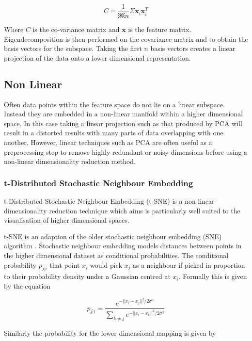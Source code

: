 \begin{equation}
	C = \frac{1}{￼n}\Sigma \mathbf{x}_i \mathbf{x}_i^T
\end{equation}

Where $C$ is the co-variance matrix and $\mathbf{x}$ is the feature matrix. Eigendecomposition is then performed on the covariance matrix and to obtain the basis vectors for the subspace. Taking the first $n$ basis vectors creates a linear projection of the data onto a lower dimensional representation.

\subsection{Non Linear}
Often data points within the feature space do not lie on a linear subspace. Instead they are embedded in a non-linear manifold within a higher dimensional space. In this case taking a linear projection such as that produced by PCA will result in a distorted results with many parts of data overlapping with one another. However, linear techniques such as PCA are often useful as a preprocessing step to remove highly redundant or noisy dimensions before using a non-linear dimensionality reduction method.

\subsubsection{t-Distributed Stochastic Neighbour Embedding}
t-Distributed Stochastic Neighbour Embedding (t-SNE) \cite{van2008visualizing} is a non-linear dimensionality reduction technique which aims is particularly well suited to the visualisation of higher dimensional spaces. 

t-SNE is an adaption of the older stochastic neighbour embedding (SNE) algorithm \cite{hinton2002stochastic}. Stochastic neighbour embedding models distances between points in the higher dimensional dataset as conditional probabilities. The conditional probability $p_{j|i}$ that point $x_i$ would pick $x_j$ as a neighbour if picked in proportion to their probability density under a Gaussian centred at $x_i$. Formally this is given by the equation

\begin{equation}
	p_{j|i} = \frac{e^{-||x_i - x_j ||^2 / 2\sigma^2}}{\sum_{k\neq j} e^{-||x_i - x_k ||^2 / 2\sigma^2}}
\end{equation}

Similarly the probability for the lower dimensional mapping is given by

